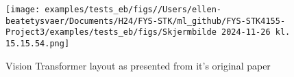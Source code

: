 \begin{figure}[H]
    \centering
    \texttt{[image: examples/tests\_eb/figs//Users/ellen-beatetysvaer/Documents/H24/FYS-STK/ml\_github/FYS-STK4155-Project3/examples/tests\_eb/figs/Skjermbilde 2024-11-26 kl. 15.15.54.png]}
    \caption{Vision Transformer layout as presented from it's original paper \cite{first_vit}}
    \label{fig:ViT}
\end{figure}




%

%
%

%
%
